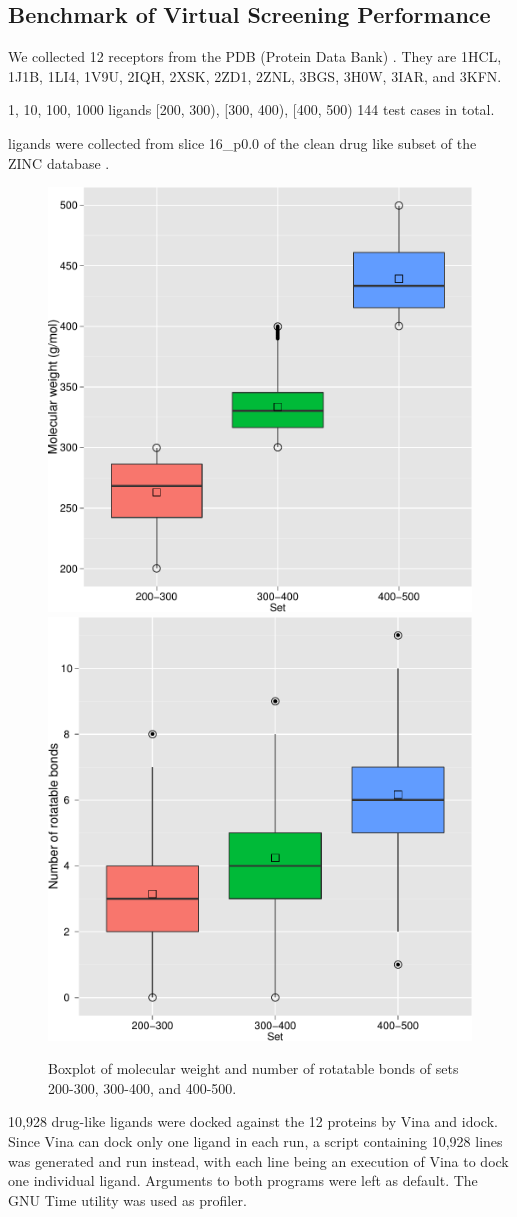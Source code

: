 \documentclass[10pt,conference,compsocconf]{../IEEEtran}
\begin{document}
\subsection{Benchmark of Virtual Screening Performance}

We collected 12 receptors from the PDB (Protein Data Bank) \cite{540,537}. They are 1HCL, 1J1B, 1LI4, 1V9U, 2IQH, 2XSK, 2ZD1, 2ZNL, 3BGS, 3H0W, 3IAR, and 3KFN.

1, 10, 100, 1000 ligands
[200, 300), [300, 400), [400, 500)
144 test cases in total.

ligands were collected from slice 16\_p0.0 of the clean drug like subset of the ZINC database \cite{532}.

\begin{figure}
\centering
\subfloat
{
  \includegraphics[width=0.485\linewidth]{MWT.pdf}
}
\subfloat
{
  \includegraphics[width=0.485\linewidth]{NRB.pdf}
}
\caption{Boxplot of molecular weight and number of rotatable bonds of sets 200-300, 300-400, and 400-500.}
\label{MWT-NRB}
\end{figure}

10,928 drug-like ligands were docked against the 12 proteins by Vina and idock. Since Vina can dock only one ligand in each run, a script containing 10,928 lines was generated and run instead, with each line being an execution of Vina to dock one individual ligand. Arguments to both programs were left as default. The GNU Time utility was used as profiler.
\end{document}

